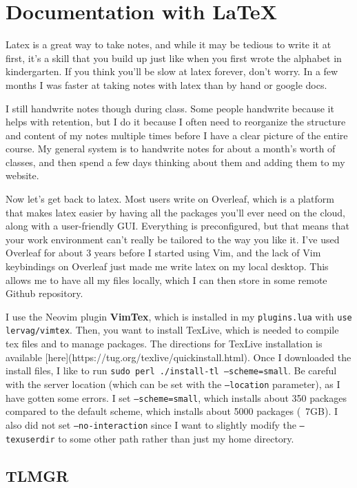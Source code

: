 \section{Documentation with LaTeX} 

  Latex is a great way to take notes, and while it may be tedious to write it at first, it's a skill that you build up just like when you first wrote the alphabet in kindergarten. If you think you'll be slow at latex forever, don't worry. In a few months I was faster at taking notes with latex than by hand or google docs. 

  I still handwrite notes though during class. Some people handwrite because it helps with retention, but I do it because I often need to reorganize the structure and content of my notes multiple times before I have a clear picture of the entire course. My general system is to handwrite notes for about a month's worth of classes, and then spend a few days thinking about them and adding them to my website.  

  Now let's get back to latex. Most users write on Overleaf, which is a platform that makes latex easier by having all the packages you'll ever need on the cloud, along with a user-friendly GUI. Everything is preconfigured, but that means that your work environment can't really be tailored to the way you like it. I've used Overleaf for about 3 years before I started using Vim, and the lack of Vim keybindings on Overleaf just made me write latex on my local desktop. This allows me to have all my files locally, which I can then store in some remote Github repository.  

  I use the Neovim plugin \textbf{VimTex}, which is installed in my \texttt{plugins.lua} with \texttt{use lervag/vimtex}. Then, you want to install TexLive, which is needed to compile tex files and to manage packages. The directions for TexLive installation is available [here](https://tug.org/texlive/quickinstall.html). Once I downloaded the install files, I like to run \texttt{sudo perl ./install-tl --scheme=small}. Be careful with the server location (which can be set with the \texttt{--location} parameter), as I have gotten some errors. I set \texttt{--scheme=small}, which installs about 350 packages compared to the default scheme, which installs about 5000 packages (~7GB). I also did not set \texttt{--no-interaction} since I want to slightly modify the \texttt{--texuserdir} to some other path rather than just my home directory. 

\subsection{TLMGR}

